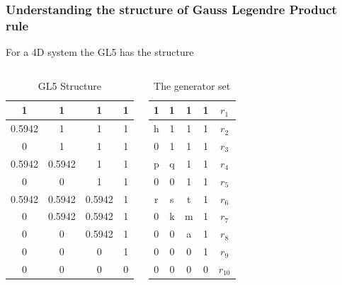 \documentclass{beamer}
\begin{document}
\begin{frame}
\frametitle{Understanding the structure of Gauss Legendre Product rule}
For a 4D system the GL5 has the  structure
\begin{columns}[c]
\begin{table}
\caption{GL5 Structure}
\label{optsoln12}
\begin{center}
\small
\begin{tabular}{|c|c|c|c|}
\hline
1    &  1  & 1    &  1   \\
\hline
0.5942 & 1  & 1   &  1 \\
\hline
0    & 1  & 1  &  1 \\
\hline
0.5942  &  0.5942 & 1  &  1 \\
\hline
0   & 0  & 1   & 1 \\
\hline
0.5942   & 0.5942 & 0.5942   & 1 \\
\hline
0   & 0.5942  & 0.5942   & 1 \\
\hline
0   & 0  & 0.5942   & 1 \\
\hline
0   & 0  & 0   & 1 \\
\hline
0   & 0  & 0   & 0 \\
\hline
\end{tabular}
\end{center}
\end{table}


\begin{table}
\caption{The generator set}
\label{optsoln12}
\begin{center}
\small
\begin{tabular}{|c|c|c|c||c|}
\hline
1    &  1  & 1    &  1 & $r_1$  \\
\hline
h & 1  & 1   &  1 & $r_2$\\
\hline
0    & 1  & 1  &  1 & $r_3$\\
\hline
p  &  q & 1  &  1 & $r_4$\\
\hline
0   & 0  & 1   & 1 & $r_5$\\
\hline
r   & s & t   & 1 & $r_6$\\
\hline
0   & k  & m   & 1 & $r_7$\\
\hline
0   & 0  & a   & 1 & $r_8$\\
\hline
0   & 0  & 0   & 1 & $r_9$\\
\hline
0   & 0  & 0   & 0 & $r_{10}$\\
\hline
\end{tabular}
\end{center}
\end{table}
\end{columns} 
\end{frame}
\end{document}
